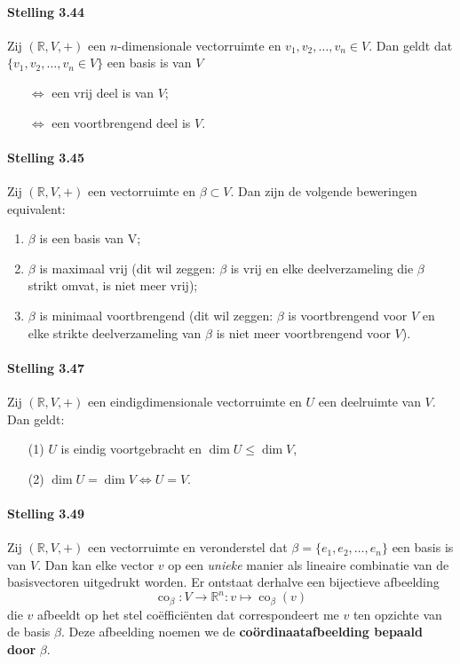 \documentclass[11pt,oneside,a4paper]{article}
\DeclareMathOperator{\co}{co}
\begin{document}
	\paragraph{Stelling 3.44}
		Zij $(\mathbb{R}, V, +)$ een $n$-dimensionale vectorruimte en $v_1,v_2,\ldots ,v_n \in V$. Dan geldt dat $\{v_1,v_2,\ldots ,v_n \in V\}$ een basis is van $V$
		\begin{itemize}
			\item[$\Leftrightarrow$] een vrij deel is van $V$;
			\item[$\Leftrightarrow$] een voortbrengend deel is $V$. 
		\end{itemize}
	\paragraph{Stelling 3.45}	
		Zij $(\mathbb{R}, V, +)$ een vectorruimte en $\beta \subset V$. Dan zijn de volgende beweringen equivalent:
		\begin{enumerate}
			\item $\beta$ is een basis van V;
			\item $\beta$ is maximaal vrij (dit wil zeggen: $\beta$ is vrij en elke deelverzameling die $\beta$ strikt omvat, is niet meer vrij);
			\item $\beta$ is minimaal voortbrengend (dit wil zeggen: $\beta$ is voortbrengend voor $V$ en elke strikte deelverzameling van $\beta$ is niet meer voortbrengend voor $V$).
		\end{enumerate}
	\paragraph{Stelling 3.47}
		Zij	$(\mathbb{R}, V, +)$ een eindigdimensionale vectorruimte en $U$ een deelruimte van $V$. Dan geldt:
		\begin{itemize}
			\item[(1)] $U$ is eindig voortgebracht en $\dim U \le \dim V$,
			\item[(2)] $\dim U = \dim V \Leftrightarrow U=V$.
		\end{itemize}
	\paragraph{Stelling 3.49}
		Zij	$(\mathbb{R}, V, +)$ een vectorruimte en veronderstel dat $\beta = \{e_1,e_2,\ldots ,e_n\}$ een basis is van $V$. Dan kan elke vector $v$ op een \textit{unieke} manier als lineaire combinatie van de basisvectoren uitgedrukt worden. Er ontstaat derhalve een bijectieve afbeelding
		$$\co_\beta : V \to \mathbb{R}^n: v \mapsto \co_\beta(v)$$
		die $v$ afbeeldt op het stel coëfficiënten dat correspondeert me $v$ ten opzichte van de basis $\beta$. Deze afbeelding noemen we de \textbf{coördinaatafbeelding bepaald door} $\beta$.
\end{document}
